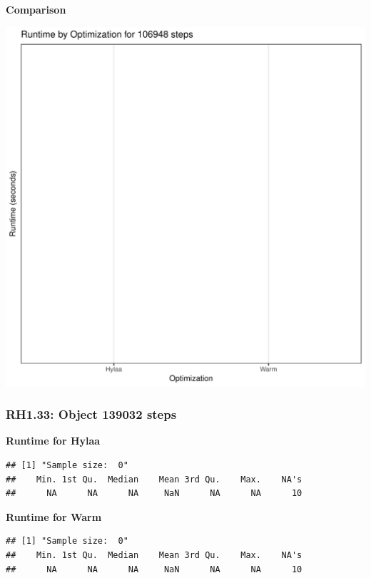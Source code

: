 \documentclass{article}\usepackage[]{graphicx}\usepackage[]{color}
\makeatletter
\def\maxwidth{ %
  \ifdim\Gin@nat@width>\linewidth
    \linewidth
  \else
    \Gin@nat@width
  \fi
}
\newenvironment{kframe}{%
 \def\at@end@of@kframe{}%
 \ifinner\ifhmode%
  \def\at@end@of@kframe{\end{minipage}}%
  \begin{minipage}{\columnwidth}%
 \fi\fi%
 \def\FrameCommand##1{\hskip\@totalleftmargin \hskip-\fboxsep
 \colorbox{shadecolor}{##1}\hskip-\fboxsep
     \hskip-\linewidth \hskip-\@totalleftmargin \hskip\columnwidth}%
 \MakeFramed {\advance\hsize-\width
   \@totalleftmargin\z@ \linewidth\hsize
   \@setminipage}}%
 {\par\unskip\endMakeFramed%
 \at@end@of@kframe}
\newenvironment{knitrout}{}{} %
\makeatother
\begin{document}
 \textbf{Comparison}
  
\begin{knitrout}
\color{fgcolor}
\includegraphics[width=\maxwidth]{figure/RH1_steps106948-1} 

\end{knitrout}


\subsubsection{RH1.33: Object 139032 steps}

 \textbf{Runtime for Hylaa}
\begin{knitrout}
\color{fgcolor}\begin{kframe}
\begin{verbatim}
## [1] "Sample size:  0"
##    Min. 1st Qu.  Median    Mean 3rd Qu.    Max.    NA's 
##      NA      NA      NA     NaN      NA      NA      10
\end{verbatim}
\end{kframe}
\end{knitrout}
 \textbf{Runtime for Warm}
\begin{knitrout}
\color{fgcolor}\begin{kframe}
\begin{verbatim}
## [1] "Sample size:  0"
##    Min. 1st Qu.  Median    Mean 3rd Qu.    Max.    NA's 
##      NA      NA      NA     NaN      NA      NA      10
\end{verbatim}
\end{kframe}
\end{knitrout}
  
\end{document}
